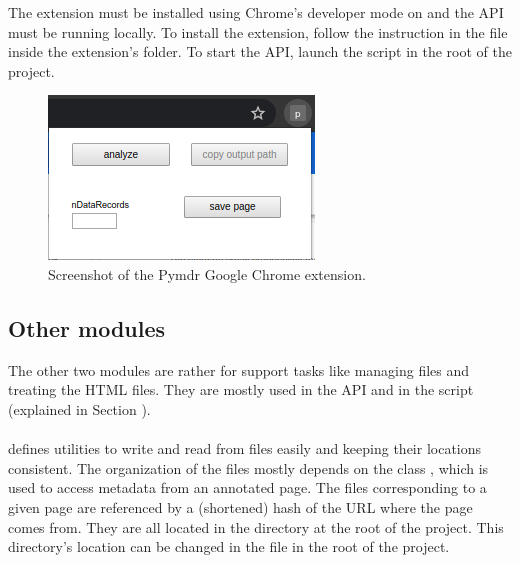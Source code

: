 \documentclass[10pt]{article}
\begin{document}
The extension must be installed using Chrome's developer mode on and the API must be running locally. To install the extension, follow the instruction in the  file inside the extension's folder\footnotemark. To start the API, launch the script  in the root of the project\footnotemark.



\begin{figure}[h]
    \centering
    \includegraphics[width=0.45\linewidth]{fig/pymdr-extension.png}
    \caption{Screenshot of the Pymdr Google Chrome extension.}
    \label{fig:chrome-extension}
\end{figure}



\subsection{Other modules} \label{txt:other-modules}

The other two modules are rather for support tasks like managing files and treating the HTML files. They are mostly used in the API and in the script  (explained in Section ). 

\paragraph{} 

defines utilities to write and read from files easily and keeping their locations consistent. The organization of the files mostly depends on the class , which is used to access metadata from an annotated page. The files corresponding to a given page are referenced by a (shortened) hash of the URL where the page comes from. They are all located in the directory  at the root of the project. This directory's location can be changed in the file  in the root of the project.
\end{document}
